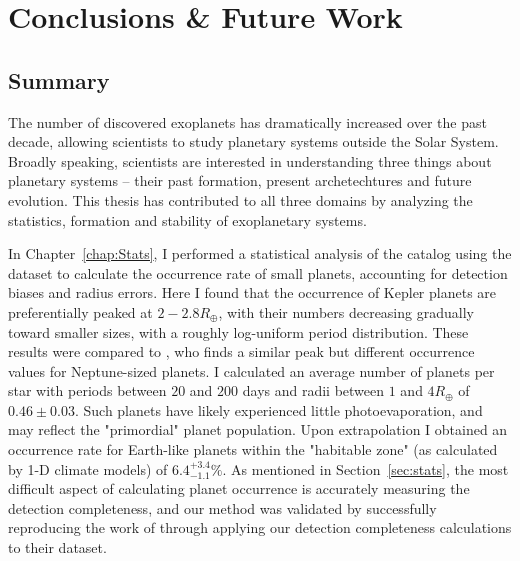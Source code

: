 \chapter{Conclusions \& Future Work}
\section{Summary}
The number of discovered exoplanets has dramatically increased over the past decade, allowing scientists to study planetary systems outside the Solar System. 
Broadly speaking, scientists are interested in understanding three things about planetary systems -- their past formation, present archetechtures and future evolution. 
This thesis has contributed to all three domains by analyzing the statistics, formation and stability of exoplanetary systems. 

In Chapter~\ref{chap:Stats}, I performed a statistical analysis of the \kep catalog using the \citet{Ramirez2014} dataset to calculate the occurrence rate of small planets, accounting for detection biases and radius errors. 
Here I found that the occurrence of Kepler planets are preferentially peaked at $2-2.8R_\oplus$, with their numbers decreasing gradually toward smaller sizes, with a roughly log-uniform period distribution.
These results were compared to \citet{Petigura2013}, who finds a similar peak but different occurrence values for Neptune-sized planets. 
I calculated an average number of planets per star with periods between $20$ and $200$ days and radii between $1$ and $4R_\oplus$ of $0.46 \pm 0.03$. 
Such planets have likely experienced little photoevaporation, and may reflect the "primordial" planet population. 
Upon extrapolation I obtained an occurrence rate for Earth-like planets within the "habitable zone" (as calculated by 1-D climate models) of $6.4^{+3.4}_{-1.1}\%$. 
As mentioned in Section~\ref{sec:stats}, the most difficult aspect of calculating planet occurrence is accurately measuring the detection completeness, and our method was validated by successfully reproducing the work of \citet{Petigura2013} through applying our detection completeness calculations to their dataset.

